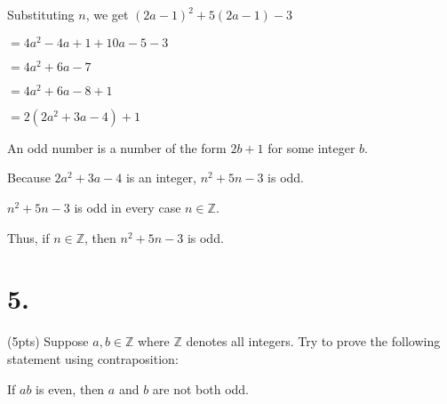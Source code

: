 \documentclass{article}
\newenvironment{Problem}
{\noindent\color{black}}
{\newline}
\newenvironment{Solution}
{\noindent\color{red}}
{\newline}
\begin{document}
\begin{Solution}
\begin{adjustwidth}{2em}{0em}
\begin{adjustwidth}{2em}{0em}
            Substituting $n$, we get $(2a - 1)^2+5(2a - 1) - 3$

            \hspace*{9em}$= 4a^2-4a+1+10a-5-3$

            \hspace*{9em}$= 4a^2+6a-7$

            \hspace*{9em}$= 4a^2+6a-8+1$

            \hspace*{9em}$=2(2a^2+3a-4)+1$

            \phantom{ }

            An odd number is a number of the form $2b + 1$
            for some integer $b$. 
            
            Because $2a^2+3a-4$ is an
            integer, $n^2 + 5n - 3$ is odd. 
        \end{adjustwidth}

        \phantom{ }

        $n^2 + 5n - 3$ is odd in every case $n \in \mathbb Z$.

        \phantom{ }

        Thus, if $n \in \mathbb Z$, then $n^2 + 5n - 3$ is odd. 
    \end{adjustwidth}
    \phantom{ }
\end{Solution}

\vspace*{17em}

\section*{5. }

\begin{Problem}
    (5pts) Suppose $a, b \in \mathbb Z$ where $\mathbb Z$ denotes all integers. 
    Try to prove the following statement using contraposition:

    If $ab$ is even, then $a$ and $b$ are not both odd.
\end{Problem}
\end{document}

